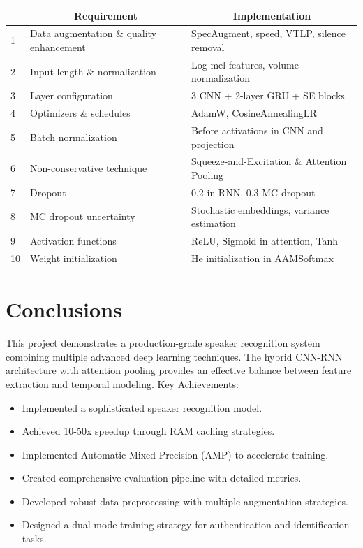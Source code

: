 \documentclass[12pt,a4paper]{article}
\begin{document}
\begin{table}[H]
\centering
\begin{tabular}{|l|l|l|}
\hline
\multicolumn{1}{|c|}{\textbf{}} & 
\multicolumn{1}{c|}{\textbf{Requirement}} & 
\multicolumn{1}{c|}{\textbf{Implementation}} \\
\hline
1 & Data augmentation \& quality enhancement & SpecAugment, speed, VTLP, silence removal \\
2 & Input length \& normalization & Log-mel features, volume normalization \\
3 & Layer configuration & 3 CNN + 2-layer GRU + SE blocks \\
4 & Optimizers \& schedules & AdamW, CosineAnnealingLR \\
5 & Batch normalization & Before activations in CNN and projection \\
6 & Non-conservative technique & Squeeze-and-Excitation \& Attention Pooling \\
7 & Dropout & 0.2 in RNN, 0.3 MC dropout \\
8 & MC dropout uncertainty & Stochastic embeddings, variance estimation \\
9 & Activation functions & ReLU, Sigmoid in attention, Tanh \\
10 & Weight initialization & He initialization in AAMSoftmax \\
\hline
\end{tabular}
\end{table}




\section{Conclusions}

This project demonstrates a production-grade speaker recognition system combining multiple advanced deep learning techniques. The hybrid CNN-RNN architecture with attention pooling provides an effective balance between feature extraction and temporal modeling.
\newline Key Achievements:

\begin{itemize}
    \item Implemented a sophisticated speaker recognition model.
    \item Achieved 10-50x speedup through RAM caching strategies.
    \item Implemented Automatic Mixed Precision (AMP) to accelerate training.
    \item Created comprehensive evaluation pipeline with detailed metrics.
    \item Developed robust data preprocessing with multiple augmentation strategies.
    \item Designed a dual-mode training strategy for authentication and identification tasks.
\end{itemize}
\end{document}
